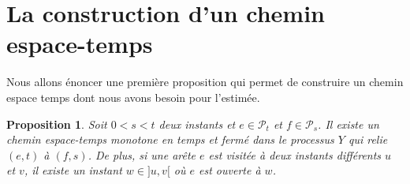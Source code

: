 \documentclass[titlepage,a4paper,12pt]{article}
\newcounter{prop}
\newtheorem{propo}[prop]{Proposition}
\begin{document}
\section{La construction d'un chemin espace-temps}
Nous allons énoncer une première proposition qui permet de construire un chemin espace temps dont nous avons besoin pour l'estimée.

\begin{propo} \label{stc}Soit $0<s<t$ deux instants et $e\in \mathcal{P}_t$ et $f \in \mathcal{P}_s$. Il existe un chemin espace-temps monotone en temps et fermé dans le processus $Y$ qui relie $(e,t)$ à $(f,s)$. De plus, si une arête $e$ est visitée à deux instants différents $u$ et $v$, il existe un instant $w\in ]u,v[$ où $e$ est ouverte à $w$.
\end{propo}
\end{document}
